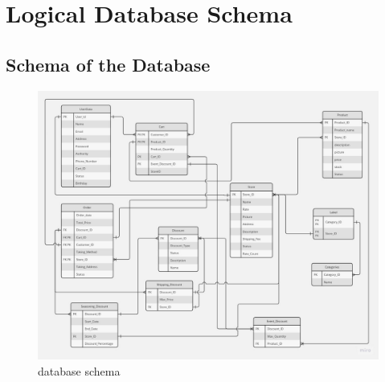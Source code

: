 \documentclass[a4paper, 12pt]{article}
\begin{document}
\newpage

\section{Logical Database Schema}
\subsection{Schema of the Database}

\begin{figure}[h]
    \centering
    \includegraphics[width=40em]{schema-diagram.jpg}
    \caption{database schema}
    \label{fig:enter-label}
\end{figure}

\newpage
\end{document}
